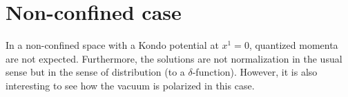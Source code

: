 \section{Non-confined case}\label{vacuum-without_bdy}
In a non-confined space with a Kondo potential at $x^1 = 0$,
quantized momenta are not expected.
Furthermore, the solutions are not normalization in the usual sense but in the sense of distribution (to a $\delta$-function). 
However, it is also interesting to see how the vacuum is polarized in this case. 


